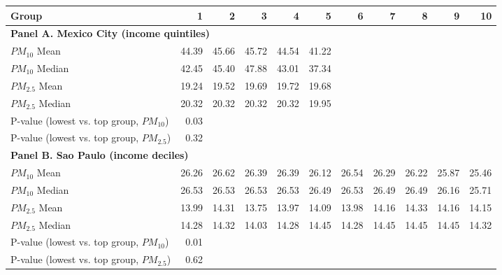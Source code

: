 \begin{tabular}{lrrrrrrrrrr}
    \toprule
    \toprule
    Group & 1 & 2 & 3 & 4 & 5 & 6 & 7 & 8 & 9 & 10 \\
    \midrule
    \multicolumn{11}{l}{\textbf{Panel A. Mexico City (income quintiles)}} \\
    \midrule
    $PM_{10}$ Mean & 44.39 & 45.66 & 45.72 & 44.54 & 41.22 &  &  &  &  &  \\
    $PM_{10}$ Median & 42.45 & 45.40 & 47.88 & 43.01 & 37.34 &  &  &  &  &  \\
    $PM_{2.5}$ Mean & 19.24 & 19.52 & 19.69 & 19.72 & 19.68 &  &  &  &  &  \\
    $PM_{2.5}$ Median & 20.32 & 20.32 & 20.32 & 20.32 & 19.95 &  &  &  &  &  \\
    P-value (lowest vs. top group, $PM_{10}$) & 0.03 &  &  &  &  &  &  &  &  &  \\
    P-value (lowest vs. top group, $PM_{2.5}$) & 0.32 &  &  &  &  &  &  &  &  &  \\
    \midrule
    \multicolumn{11}{l}{\textbf{Panel B. Sao Paulo (income deciles)}} \\
    \midrule
    $PM_{10}$ Mean & 26.26 & 26.62 & 26.39 & 26.39 & 26.12 & 26.54 & 26.29 & 26.22 & 25.87 & 25.46 \\
    $PM_{10}$ Median & 26.53 & 26.53 & 26.53 & 26.53 & 26.49 & 26.53 & 26.49 & 26.49 & 26.16 & 25.71 \\
    $PM_{2.5}$ Mean & 13.99 & 14.31 & 13.75 & 13.97 & 14.09 & 13.98 & 14.16 & 14.33 & 14.16 & 14.15 \\
    $PM_{2.5}$ Median & 14.28 & 14.32 & 14.03 & 14.28 & 14.45 & 14.28 & 14.45 & 14.45 & 14.45 & 14.32 \\
    P-value (lowest vs. top group, $PM_{10}$) & 0.01 &  &  &  &  &  &  &  &  &  \\
    P-value (lowest vs. top group, $PM_{2.5}$) & 0.62 &  &  &  &  &  &  &  &  &  \\
    \bottomrule
    \bottomrule
\end{tabular}

